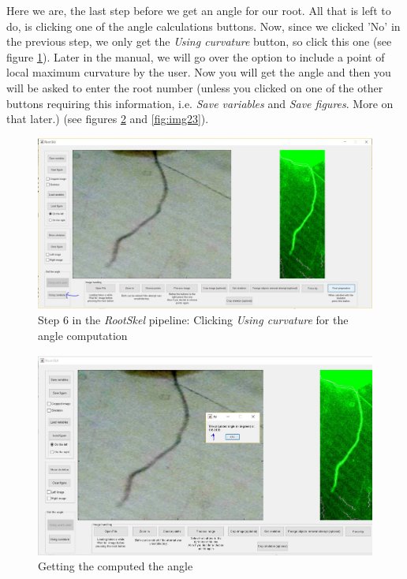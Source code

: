 Here we are, the last step before we get an angle for our root. 
All that is left to do, is clicking one of the angle calculations buttons.
Now, since we clicked 'No' in the previous step, we only get the \textit{Using curvature} button, so click this one (see figure \ref{fig:img21}).
Later in the manual, we will go over the option to include a point of local maximum curvature by the user. 
Now you will get the angle and then you will be asked to enter the root number (unless you clicked on one of the other buttons requiring this information, i.e. \textit{Save variables} and \textit{Save figures}. More on that later.) (see figures \ref{fig:img22} and \ref{fig:img23}).

\begin{figure}[H]
	\centering
	\includegraphics[width=\textwidth]{../Figures/manual/step18.jpg}
	\caption{Step 6 in the \textit{RootSkel} pipeline: Clicking \textit{Using curvature} for the angle computation}
	\label{fig:img21}
\end{figure}

\begin{figure}[H]
	\centering
	\includegraphics[width=\textwidth]{../Figures/manual/step19.jpg}
	\caption{Getting the computed the angle}
	\label{fig:img22}
\end{figure}

